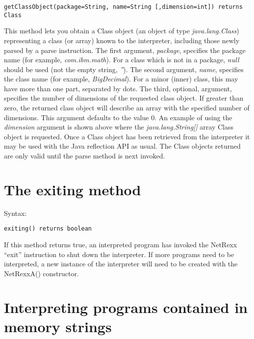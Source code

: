 \begin{lstlisting}[label=getclassobject,caption=getClassObject]
getClassObject(package=String, name=String [,dimension=int]) returns Class
\end{lstlisting}

This method lets you obtain a Class object (an object of
type \emph{java.lang.Class})  representing a class (or array) known to
the interpreter, including those newly parsed by a parse instruction.
\newline
The first argument, \emph{package}, specifies the package name (for
example, \emph{com.ibm.math}).  For a class which is not in a
package, \emph{null} should be used (not the empty string, \emph{''}).
\newline
The second argument, \emph{name}, specifies the class name (for example,
\emph{BigDecimal}).  For a minor (inner) class, this may have
more than one part, separated by dots.
\newline
The third, optional, argument, specifies the number of dimensions of
the requested class object.  If greater than zero, the returned class
object will describe an array with the specified number of dimensions.
This argument defaults to the value 0.
\newline
An example of using the \emph{dimension} argument is shown above where
the \emph{java.lang.String[]} array Class object is requested.
\newline
Once a Class object has been retrieved from the interpreter it may be
used with the Java reflection API as usual.  The Class objects returned
are only valid until the parse method is next invoked.


\section{The exiting method}

Syntax:
\begin{lstlisting}[label=exiting,caption=exiting]
exiting() returns boolean
\end{lstlisting}
If this method returns true, an interpreted program has invoked the NetRexx “exit” instruction to shut down the interpreter. If more programs need to be interpreted, a new instance of the interpreter will need to be created with the NetRexxA() constructor.

\section{Interpreting programs contained in memory strings}

